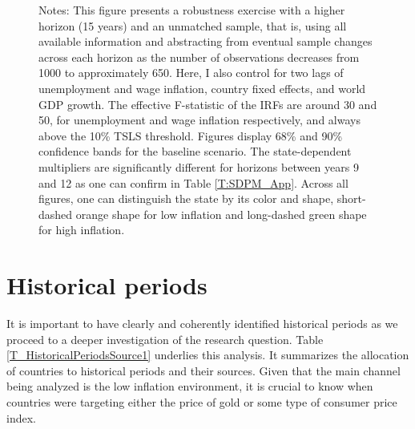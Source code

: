 \documentclass[12pt]{article}
\newcommand{\annote}[1]{\parbox{\textwidth}{\renewcommand{\baselinestretch}{1.0}\vspace{12pt} \footnotesize Notes: #1}}
\begin{document}
\begin{appendices}
\begin{figure}[h!]
\begin{subfigure}[b]{0.8\textwidth}
		\end{subfigure}
		\annote{This figure presents a robustness exercise with a higher horizon (15 years) and an unmatched sample, that is, using all available information and abstracting from eventual sample changes across each horizon as the number of observations decreases from 1000 to approximately 650. Here, I also control for two lags of unemployment and wage inflation, country fixed effects, and world GDP growth. The \cite{Olea2013} effective F-statistic of the IRFs are around 30 and 50, for unemployment and wage inflation respectively, and always above the 10\% TSLS threshold. Figures display 68\% and 90\% confidence bands for the baseline scenario. The state-dependent multipliers are significantly different for horizons between years 9 and 12 as one can confirm in Table \ref{T:SDPM_App}. Across all figures, one can distinguish the state by its color and shape, short-dashed orange shape for low inflation and long-dashed green shape for high inflation.}
	
\end{figure}



\clearpage

\setcounter{table}{0}
\setcounter{figure}{0}

\section{Historical periods} \label{SS_HistoricalPeriods}

It is important to have clearly and coherently identified historical periods as we proceed to a deeper investigation of the research question. Table \ref{T_HistoricalPeriodsSource1} underlies this analysis. It summarizes the allocation of countries to historical periods and their sources. Given that the main channel being analyzed is the low inflation environment, it is crucial to know when countries were targeting either the price of gold or some type of consumer price index.


\end{appendices}
\end{document}
